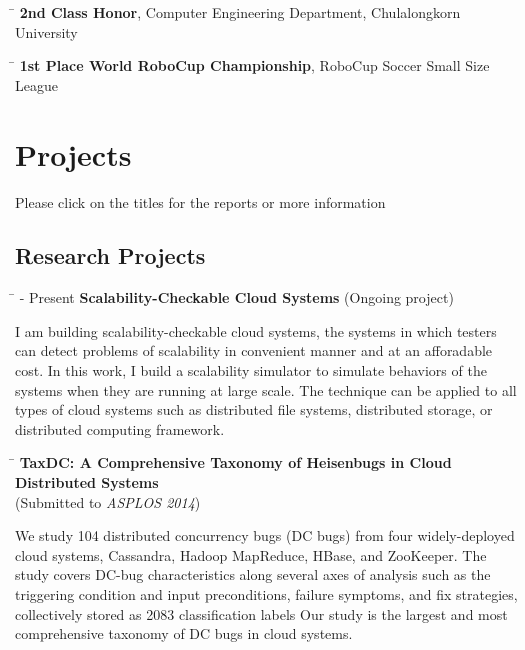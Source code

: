 \documentclass[10pt]{article} %
\begin{document}
\begin{tabbing}
\hspace{2.5cm} \=  \> \textbf{2nd Class Honor}, Computer Engineering Department, Chulalongkorn University
\end{tabbing}

\begin{tabbing}
\hspace{2.5cm} \=  \> \textbf{1st Place World RoboCup Championship}, RoboCup Soccer Small Size League
\end{tabbing}



\section{Projects}
\vspace{-4mm}
{\footnotesize Please click on the titles for the reports or more information}

\subsection{Research Projects}

\begin{tabbing}
\hspace{2.5cm} \=  - Present \>\+ \textbf{Scalability-Checkable Cloud Systems} (Ongoing project) \\
\begin{minipage}{\smallertextwidth}
I am building scalability-checkable cloud systems, the systems in which testers can detect
problems of scalability in convenient manner and at an afforadable cost. In
this work, I build a scalability simulator to simulate behaviors of the systems when they
are running at large scale. The technique can be applied to all types of cloud systems such
as distributed file systems, distributed storage, or distributed computing framework.
\end{minipage}
\end{tabbing}

\begin{tabbing}
\hspace{2.5cm} \=  \> \textbf{TaxDC: A Comprehensive Taxonomy of Heisenbugs in Cloud Distributed Systems} \\
\>\+ (Submitted to \textit{ASPLOS 2014}) \\
\begin{minipage}{\smallertextwidth}
We study 104 distributed concurrency bugs (DC bugs) from four 
widely-deployed cloud systems, Cassandra, Hadoop MapReduce, HBase, and
ZooKeeper. The study covers DC-bug characteristics along several axes of analysis such
as the triggering condition and input preconditions, failure symptoms, and fix strategies, 
collectively stored as 2083 classification labels Our study is the largest and most 
comprehensive taxonomy of DC bugs in cloud systems.
\end{minipage}
\end{tabbing}
\end{document}
